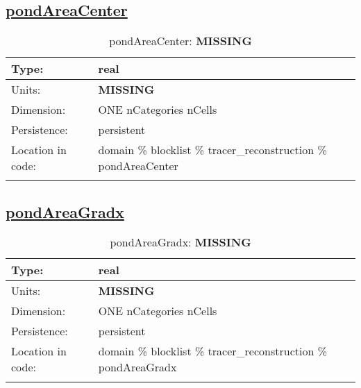 \subsection[pondAreaCenter]{\hyperref[sec:var_tab_tracer_reconstruction]{pondAreaCenter}}
\label{subsec:var_sec_tracer_reconstruction_pondAreaCenter}
\begin{center}
\begin{longtable}{| p{2.0in} | p{4.0in} |}
        \hline 
        Type: & real \\
        \hline 
        Units: & {\bf \color{red} MISSING} \\
        \hline 
        Dimension: & ONE nCategories nCells \\
        \hline 
        Persistence: & persistent \\
        \hline 
         Location in code: & domain \% blocklist \% tracer\_reconstruction \% pondAreaCenter \\
         \hline 
    \caption{pondAreaCenter: {\bf \color{red} MISSING}}
\end{longtable}
\end{center}
\subsection[pondAreaGradx]{\hyperref[sec:var_tab_tracer_reconstruction]{pondAreaGradx}}
\label{subsec:var_sec_tracer_reconstruction_pondAreaGradx}
\begin{center}
\begin{longtable}{| p{2.0in} | p{4.0in} |}
        \hline 
        Type: & real \\
        \hline 
        Units: & {\bf \color{red} MISSING} \\
        \hline 
        Dimension: & ONE nCategories nCells \\
        \hline 
        Persistence: & persistent \\
        \hline 
         Location in code: & domain \% blocklist \% tracer\_reconstruction \% pondAreaGradx \\
         \hline 
    \caption{pondAreaGradx: {\bf \color{red} MISSING}}
\end{longtable}
\end{center}
